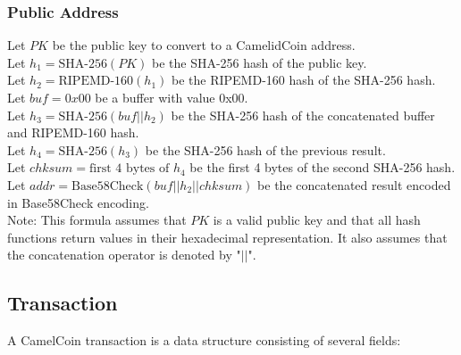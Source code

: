 \documentclass{article}
\begin{document}
\subsubsection{Public Address}

Let $PK$ be the public key to convert to a CamelidCoin address.\\
Let $h_1 = \text{SHA-256}(PK)$ be the SHA-256 hash of the public key.\\
Let $h_2 = \text{RIPEMD-160}(h_1)$ be the RIPEMD-160 hash of the SHA-256 hash.\\
Let $buf = 0x00$ be a buffer with value 0x00.\\
Let $h_3 = \text{SHA-256}(buf || h_2)$ be the SHA-256 hash of the concatenated buffer and RIPEMD-160 hash.\\
Let $h_4 = \text{SHA-256}(h_3)$ be the SHA-256 hash of the previous result.\\
Let $chksum = \text{first 4 bytes of } h_4$ be the first 4 bytes of the second SHA-256 hash.\\
Let $addr = \text{Base58Check}(buf || h_2 || chksum)$ be the concatenated result encoded in Base58Check encoding.\\

Note: This formula assumes that $PK$ is a valid public key and that all hash functions return values in their hexadecimal representation. It also assumes that the concatenation operator is denoted by "$||$".
\subsection{Transaction}

A CamelCoin transaction is a data structure consisting of several fields:
\end{document}

